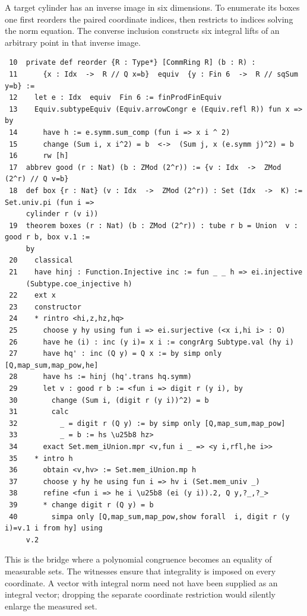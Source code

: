 \documentclass[12pt,letterpaper]{article}
\begin{document}
A target cylinder has an inverse image in six dimensions. To enumerate its boxes one first reorders the paired coordinate indices, then restricts to indices solving the norm equation. The converse inclusion constructs six integral lifts of an arbitrary point in that inverse image.
\par
{\fontsize{8.8}{10.5}\selectfont\begin{verbatim}
 10  private def reorder {R : Type*} [CommRing R] (b : R) :
 11      {x : Idx  ->  R // Q x=b}  equiv  {y : Fin 6  ->  R // sqSum y=b} :=
 12    let e : Idx  equiv  Fin 6 := finProdFinEquiv
 13    Equiv.subtypeEquiv (Equiv.arrowCongr e (Equiv.refl R)) fun x => by
 14      have h := e.symm.sum_comp (fun i => x i ^ 2)
 15      change (Sum i, x i^2) = b  <->  (Sum j, x (e.symm j)^2) = b
 16      rw [h]
 17  abbrev good (r : Nat) (b : ZMod (2^r)) := {v : Idx  ->  ZMod (2^r) // Q v=b}
 18  def box {r : Nat} (v : Idx  ->  ZMod (2^r)) : Set (Idx  ->  K) := Set.univ.pi (fun i =>
     cylinder r (v i))
 19  theorem boxes (r : Nat) (b : ZMod (2^r)) : tube r b = Union  v : good r b, box v.1 :=
     by
 20    classical
 21    have hinj : Function.Injective inc := fun _ _ h => ei.injective
     (Subtype.coe_injective h)
 22    ext x
 23    constructor
 24    * rintro <hi,z,hz,hq>
 25      choose y hy using fun i => ei.surjective (<x i,hi i> : O)
 26      have he (i) : inc (y i)= x i := congrArg Subtype.val (hy i)
 27      have hq' : inc (Q y) = Q x := by simp only [Q,map_sum,map_pow,he]
 28      have hs := hinj (hq'.trans hq.symm)
 29      let v : good r b := <fun i => digit r (y i), by
 30        change (Sum i, (digit r (y i))^2) = b
 31        calc
 32          _ = digit r (Q y) := by simp only [Q,map_sum,map_pow]
 33          _ = b := hs \u25b8 hz>
 34      exact Set.mem_iUnion.mpr <v,fun i _ => <y i,rfl,he i>>
 35    * intro h
 36      obtain <v,hv> := Set.mem_iUnion.mp h
 37      choose y hy he using fun i => hv i (Set.mem_univ _)
 38      refine <fun i => he i \u25b8 (ei (y i)).2, Q y,?_,?_>
 39      * change digit r (Q y) = b
 40        simpa only [Q,map_sum,map_pow,show forall  i, digit r (y i)=v.1 i from hy] using
     v.2
\end{verbatim}}
This is the bridge where a polynomial congruence becomes an equality of measurable sets. The witnesses ensure that integrality is imposed on every coordinate. A vector with integral norm need not have been supplied as an integral vector; dropping the separate coordinate restriction would silently enlarge the measured set.
\end{document}
